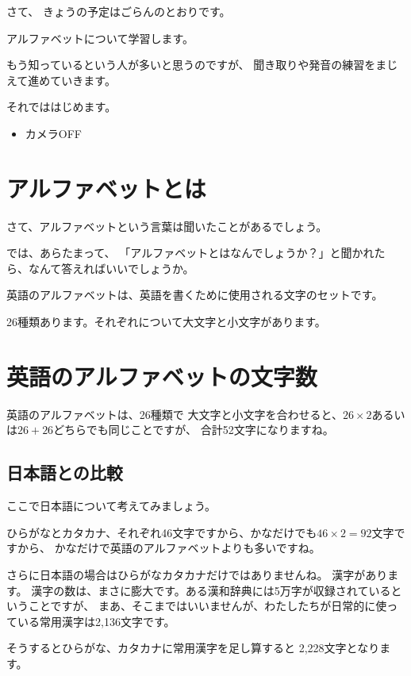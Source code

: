 \documentclass[book,jafontscale=0.9247]{jlreq}
\begin{document}
さて、
きょうの予定はごらんのとおりです。

アルファベットについて学習します。

もう知っているという人が多いと思うのですが、
聞き取りや発音の練習をまじえて進めていきます。

それでははじめます。

\begin{tcolorbox}[title=zoomの管理ボタンで]
\begin{itemize}
 \item カメラOFF
\end{itemize}
\end{tcolorbox}


\section{アルファベットとは}

さて、アルファベットという言葉は聞いたことがあるでしょう。

では、あらたまって、
「アルファベットとはなんでしょうか？」と聞かれたら、なんて答えればいいでしょうか。

英語のアルファベットは、英語を書くために使用される文字のセットです。

26種類あります。それぞれについて大文字と小文字があります。

\section{英語のアルファベットの文字数}

英語のアルファベットは、26種類で
大文字と小文字を合わせると、$26\times{}2$あるいは$26+26$どちらでも同じことですが、
合計52文字になりますね。

\subsection{日本語との比較}

ここで日本語について考えてみましょう。

ひらがなとカタカナ、それぞれ46文字ですから、かなだけでも$46\times{}2=92\text{文字}$ですから、
かなだけで英語のアルファベットよりも多いですね。

さらに日本語の場合はひらがなカタカナだけではありませんね。
漢字があります。
漢字の数は、まさに膨大です。ある漢和辞典には5万字が収録されているということですが、
まあ、そこまではいいませんが、わたしたちが日常的に使っている常用漢字は2,136文字です。

そうするとひらがな、カタカナに常用漢字を足し算すると
2,228文字となります。
\end{document}
